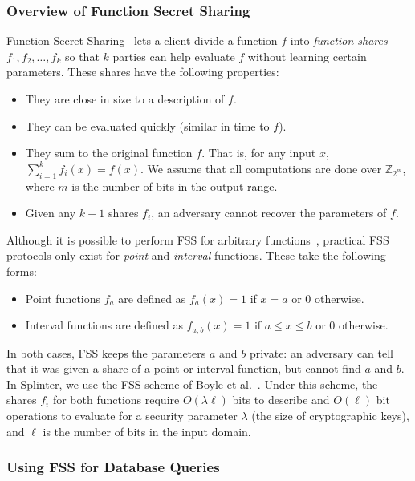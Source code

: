 \subsubsection{Overview of Function Secret Sharing}
\label{sec:fss_overview}
Function Secret Sharing~\cite{fss} lets a client divide
a function $f$ into \textit{function shares} 
$f_1,f_2,\dots,f_k$ so that $k$ parties
can help evaluate $f$ without learning certain parameters.
These shares have the following properties:

\begin{itemize}
	\item{They are close in size to a description of $f$.}
	\item{They can be evaluated quickly (similar in time to $f$).}
	\item{They sum to the original function $f$.
		That is, for any input $x$, $\sum\limits_{i=1}^k f_i(x) = f(x)$. We 
		assume that all computations are done over $\mathbb{Z}_{2^m}$, 
		where $m$ is the number of bits in the output range. }
	\item{Given any $k-1$ shares $f_i$, an adversary cannot recover the parameters 
		of $f$.}
\end{itemize} 

Although it is possible to perform
FSS for arbitrary functions~\cite{dodis2016spooky}, 
practical FSS protocols only exist for \emph{point} and \emph{interval} functions.
These take the following forms:
\begin{itemize}
	\item Point functions $f_a$ are defined as $f_a(x)=1$ if $x=a$ or 0 otherwise.
	\item Interval functions are defined as $f_{a,b}(x)=1$ if $a \le x \le b$ or 0 otherwise.
\end{itemize}

In both cases, FSS keeps the parameters $a$ and $b$ private: an adversary can tell that
it was given a share of a point or interval function, but cannot find $a$ and $b$.
In Splinter, we use the FSS scheme of Boyle et al.~\cite{fss}.
Under this scheme, the shares $f_i$ for both functions require $O(\lambda \ell)$ bits to
describe and $O(\ell)$ bit operations to evaluate for a security parameter $\lambda$ (the size
of cryptographic keys), and $\ell$ is the number of bits in the input domain.

\subsubsection{Using FSS for Database Queries}
\label{sec:fss_queries}

